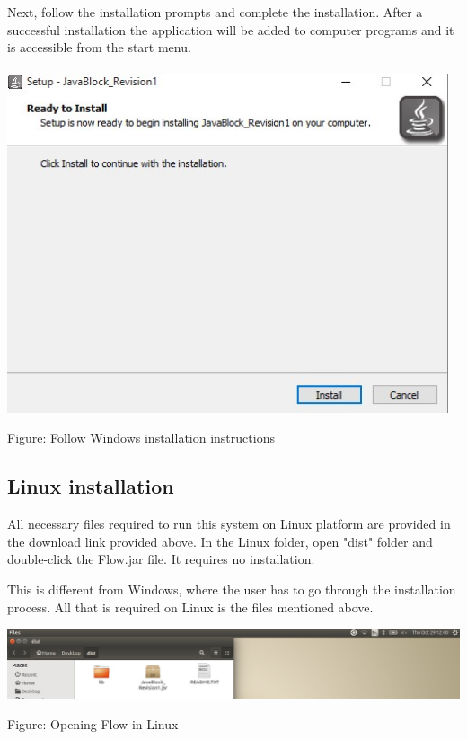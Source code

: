 \documentclass[11pt,a4paper,titlepage]{article}
\begin{document}
		Next, follow the installation prompts and complete the installation. After a successful installation the application will be added to computer programs and it is accessible from the start menu. \\ \\
		
		\includegraphics[width=13cm]{images/Install2.jpg}		
		\begin{center}
		Figure: Follow Windows installation instructions
		\end{center}
		
		\subsection{Linux installation}
		
		All necessary files required to run this system on Linux platform are provided in the download link provided above. In the Linux folder, open "dist" folder and double-click the Flow.jar file. It requires no installation.\newline 
		
		This is different from Windows, where the user has to go through the installation process. All that is required on Linux is the files mentioned above.\newline \newline
		
		\includegraphics[width=14cm]{images/linuxInstall.jpg}		
		\begin{center}
			Figure: Opening Flow in Linux \newline
		\end{center}
		
\end{document}

